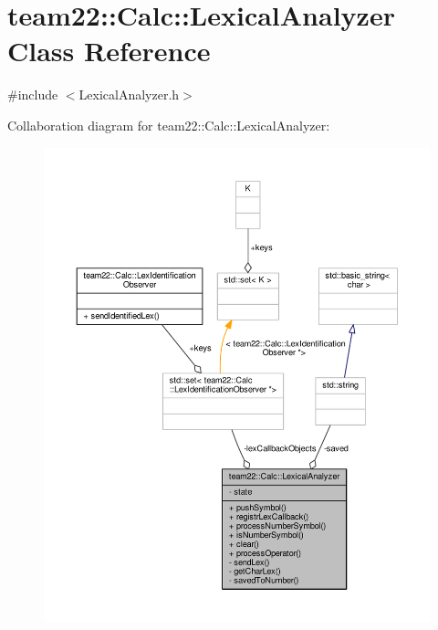 \hypertarget{classteam22_1_1_calc_1_1_lexical_analyzer}{}\section{team22\+:\+:Calc\+:\+:Lexical\+Analyzer Class Reference}
\label{classteam22_1_1_calc_1_1_lexical_analyzer}


{\ttfamily \#include $<$Lexical\+Analyzer.\+h$>$}



Collaboration diagram for team22\+:\+:Calc\+:\+:Lexical\+Analyzer\+:
\nopagebreak
\begin{figure}[H]
\begin{center}
\leavevmode
\includegraphics[width=350pt]{classteam22_1_1_calc_1_1_lexical_analyzer__coll__graph}
\end{center}
\end{figure}
